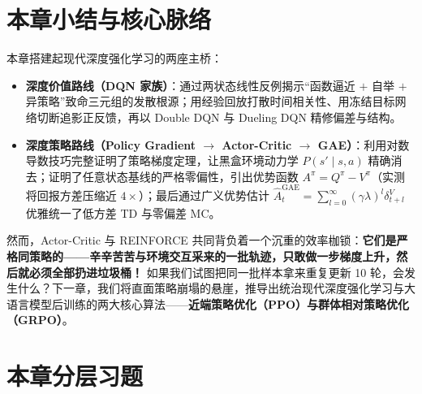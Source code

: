 \section*{本章小结与核心脉络}

本章搭建起现代深度强化学习的两座主桥：
\begin{itemize}
  \item \textbf{深度价值路线（DQN 家族）}：通过两状态线性反例揭示“函数逼近 $+$ 自举 $+$ 异策略”致命三元组的发散根源；用经验回放打散时间相关性、用冻结目标网络切断追影正反馈，再以 Double DQN 与 Dueling DQN 精修偏差与结构。
  \item \textbf{深度策略路线（Policy Gradient $\to$ Actor-Critic $\to$ GAE）}：利用对数导数技巧完整证明了策略梯度定理，让黑盒环境动力学 $P(s'\mid s,a)$ 精确消去；证明了任意状态基线的严格零偏性，引出优势函数 $A^\pi = Q^\pi - V^\pi$（实测将回报方差压缩近 $4\times$）；最后通过广义优势估计 $\hat{A}_t^{\mathrm{GAE}} = \sum_{l=0}^\infty (\gamma\lambda)^l \delta_{t+l}^V$ 优雅统一了低方差 TD 与零偏差 MC。
\end{itemize}

然而，Actor-Critic 与 REINFORCE 共同背负着一个沉重的效率枷锁：\textbf{它们是严格同策略的——辛辛苦苦与环境交互采来的一批轨迹，只敢做一步梯度上升，然后就必须全部扔进垃圾桶！} 如果我们试图把同一批样本拿来重复更新 10 轮，会发生什么？下一章，我们将直面策略崩塌的悬崖，推导出统治现代深度强化学习与大语言模型后训练的两大核心算法——\textbf{近端策略优化（PPO）与群体相对策略优化（GRPO）}。

\section*{本章分层习题}


